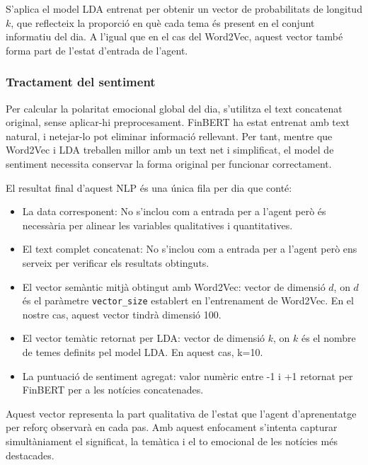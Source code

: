 \documentclass[12pt,a4paper,twoside]{book}
\begin{document}
S'aplica el model LDA entrenat per obtenir un vector de probabilitats de longitud $k$, que reflecteix la proporció en què cada tema és present en el conjunt informatiu del dia. A l'igual que en el cas del Word2Vec, aquest vector també forma part de l'estat d'entrada de l'agent.


\subsubsection{Tractament del sentiment}

Per calcular la polaritat emocional global del dia, s'utilitza el text concatenat original, sense aplicar-hi preprocesament. FinBERT ha estat entrenat amb text natural, i netejar-lo pot eliminar informació rellevant. Per tant, mentre que Word2Vec i LDA treballen millor amb un text net i simplificat, el model de sentiment necessita conservar la forma original per funcionar correctament.

El resultat final d'aquest NLP és una única fila per dia que conté:

\begin{itemize}
    \item La data corresponent: No s'inclou com a entrada per a l'agent però és necessària per alinear les variables qualitatives i quantitatives.

    \item El text complet concatenat: No s'inclou com a entrada per a l'agent però ens serveix per verificar els resultats obtinguts.

    \item El vector semàntic mitjà obtingut amb Word2Vec: vector de dimensió $d$, on $d$ és el paràmetre \texttt{vector\_size} establert en l'entrenament de Word2Vec. En el nostre cas, aquest vector tindrà dimensió 100.

    \item El vector temàtic retornat per LDA: vector de dimensió $k$, on $k$ és el nombre de temes definits pel model LDA. En aquest cas, k=10.

    \item La puntuació de sentiment agregat: valor numèric entre -1 i +1 retornat per FinBERT per a les notícies concatenades.
\end{itemize}

Aquest vector representa la part qualitativa de l'estat que l'agent d'aprenentatge per reforç observarà en cada pas. Amb aquest enfocament s'intenta capturar simultàniament el significat, la temàtica i el to emocional de les notícies més destacades.
\end{document}
